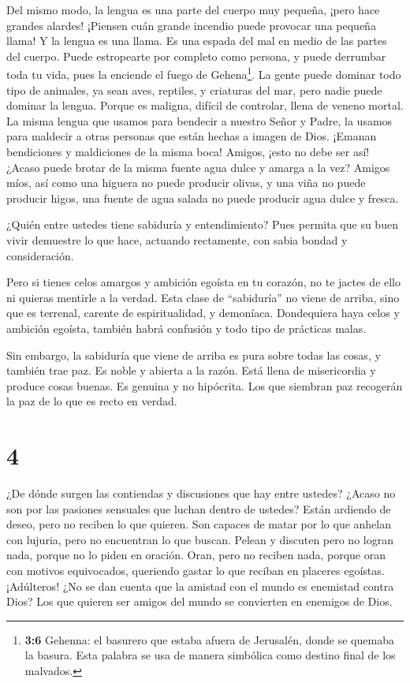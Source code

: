 Del mismo modo, la lengua es una parte del cuerpo muy
pequeña, ¡pero hace grandes alardes! ¡Piensen cuán grande incendio puede
provocar una pequeña llama!  Y la lengua es una llama. Es
una espada del mal en medio de las partes del cuerpo. Puede estropearte
por completo como persona, y puede derrumbar toda tu vida, pues la
enciende el fuego de Gehena\footnote{\textbf{3:6} Gehenna: el basurero
  que estaba afuera de Jerusalén, donde se quemaba la basura. Esta
  palabra se usa de manera simbólica como destino final de los malvados.}.
 La gente puede dominar todo tipo de animales, ya sean aves,
reptiles, y criaturas del mar,  pero nadie puede dominar la
lengua. Porque es maligna, difícil de controlar, llena de veneno mortal.
 La misma lengua que usamos para bendecir a nuestro Señor y
Padre, la usamos para maldecir a otras personas que están hechas a
imagen de Dios.  ¡Emanan bendiciones y maldiciones de la
misma boca! Amigos, ¡esto no debe ser así!  ¿Acaso puede
brotar de la misma fuente agua dulce y amarga a la vez? 
Amigos míos, así como una higuera no puede producir olivas, y una viña
no puede producir higos, una fuente de agua salada no puede producir
agua dulce y fresca.

 ¿Quién entre ustedes tiene sabiduría y entendimiento? Pues
permita que su buen vivir demuestre lo que hace, actuando rectamente,
con sabia bondad y consideración.

 Pero si tienes celos amargos y ambición egoísta en tu
corazón, no te jactes de ello ni quieras mentirle a la verdad.
 Esta clase de ``sabiduría'' no viene de arriba, sino que
es terrenal, carente de espiritualidad, y demoníaca. 
Dondequiera haya celos y ambición egoísta, también habrá confusión y
todo tipo de prácticas malas.

 Sin embargo, la sabiduría que viene de arriba es pura
sobre todas las cosas, y también trae paz. Es noble y abierta a la
razón. Está llena de misericordia y produce cosas buenas. Es genuina y
no hipócrita.  Los que siembran paz recogerán la paz de lo
que es recto en verdad.

\hypertarget{section-3}{%
\section{4}\label{section-3}}

 ¿De dónde surgen las contiendas y discusiones que hay entre
ustedes? ¿Acaso no son por las pasiones sensuales que luchan dentro de
ustedes?  Están ardiendo de deseo, pero no reciben lo que
quieren. Son capaces de matar por lo que anhelan con lujuria, pero no
encuentran lo que buscan. Pelean y discuten pero no logran nada, porque
no lo piden en oración.  Oran, pero no reciben nada, porque
oran con motivos equivocados, queriendo gastar lo que reciban en
placeres egoístas.  ¡Adúlteros! ¿No se dan cuenta que la
amistad con el mundo es enemistad contra Dios? Los que quieren ser
amigos del mundo se convierten en enemigos de Dios.

